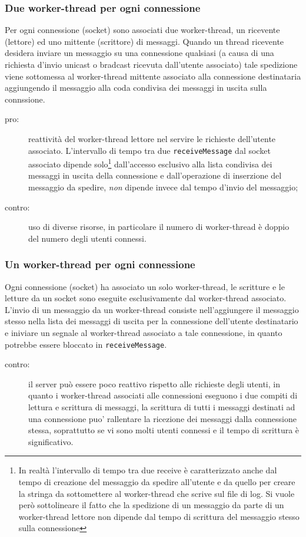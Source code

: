 \documentclass[a4paper,10pt]{article}
\begin{document}
\subsubsection{Due worker-thread per ogni connessione}
Per ogni connessione (socket) sono associati due worker-thread, un
ricevente (lettore) ed uno mittente (scrittore) di messaggi. Quando un
thread ricevente desidera inviare un messaggio su una connessione
qualsiasi (a causa di una richiesta d'invio unicast o bradcast
ricevuta dall'utente associato) tale spedizione viene sottomessa al
worker-thread mittente associato alla connessione destinataria
aggiungendo il messaggio alla coda condivisa dei messaggi in uscita
sulla connssione.
\begin{description}
  \item[pro:] reattivit\`a del worker-thread lettore nel servire le
    richieste dell'utente associato. L'intervallo di tempo tra due
    \verb+receiveMessage+ dal socket associato dipende
    solo\footnote{In realt\`a l'intervallo di tempo tra due receive
      \`e caratterizzato anche dal tempo di creazione del messaggio da
      spedire all'utente e da quello per creare la stringa da
      sottomettere al worker-thread che scrive sul file di log. Si
      vuole per\`o sottolineare il fatto che la spedizione di un
      messaggio da parte di un worker-thread lettore non dipende dal
      tempo di scrittura del messaggio stesso sulla connessione}
    dall'accesso esclusivo alla lista condivisa dei messaggi in uscita
    della connessione e dall'operazione di inserzione del messaggio da
    spedire, \emph{non} dipende invece dal tempo d'invio del
    messaggio;
  \item[contro:] uso di diverse risorse, in particolare il numero di
    worker-thread \`e doppio del numero degli utenti connessi.
\end{description}

\subsubsection{Un worker-thread per ogni connessione}
Ogni connessione (socket) ha associato un solo worker-thread, le
scritture e le letture da un socket sono eseguite esclusivamente dal
worker-thread associato. L'invio di un messaggio da un worker-thread
consiste nell'aggiungere il messaggio stesso nella lista dei messaggi
di uscita per la connessione dell'utente destinatario e iniviare un
segnale al worker-thread associato a tale connessione, in quanto
potrebbe essere bloccato in \verb+receiveMessage+.
\begin{description}
  \item[contro:] il server pu\`o essere poco reattivo rispetto alle
    richieste degli utenti, in quanto i worker-thread associati alle
    connessioni eseguono i due compiti di lettura e scrittura di
    messaggi, la scrittura di tutti i messaggi destinati ad una
    connessione puo' rallentare la ricezione dei messaggi dalla
    connessione stessa, soprattutto se vi sono molti utenti connessi e
    il tempo di scrittura \`e significativo.
\end{description}
\end{document}
